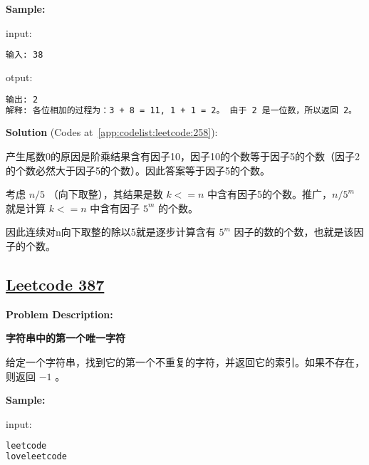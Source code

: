 \textbf{Sample:}\par

input:\par

\begin{lstlisting}[language=bash]
输入: 38

\end{lstlisting}

otput:\par

\begin{lstlisting}[language=bash]
输出: 2
解释: 各位相加的过程为：3 + 8 = 11, 1 + 1 = 2。 由于 2 是一位数，所以返回 2。
\end{lstlisting}

\textbf{Solution }(Codes at~\ref{app:codelist:leetcode:258}):\par

产生尾数0的原因是阶乘结果含有因子10，因子10的个数等于因子5的个数（因子2的个数必然大于因子5的个数）。因此答案等于因子5的个数。\par

考虑 $n/5$ （向下取整），其结果是数 $k<=n$ 中含有因子5的个数。推广，$n/5^{m}$ 就是计算 $k<=n$ 中含有因子 $5^{m}$ 的个数。\par

因此连续对n向下取整的除以5就是逐步计算含有 $5^{m}$ 因子的数的个数，也就是该因子的个数。\par



\subsection{\href{https://leetcode-cn.com/}{Leetcode 387}}\label{app:problemlist:leetcode:387}

\textbf{Problem Description:}\par

\textbf{字符串中的第一个唯一字符}\par

给定一个字符串，找到它的第一个不重复的字符，并返回它的索引。如果不存在，则返回 $ -1 $ 。\par


\textbf{Sample:}\par

input:\par

\begin{lstlisting}[language=bash]
leetcode
loveleetcode
\end{lstlisting}

